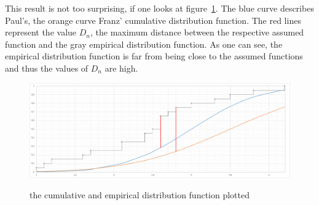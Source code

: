 \documentclass{article}
\theoremstyle{definition}
\begin{document}
This result is not too surprising, if one looks at figure~\ref{fig:1}. The blue curve describes Paul's, the orange curve Franz' cumulative distribution function. The red lines represent the value $D_n$, the maximum distance between the respective assumed function and the gray empirical distribution function.
As one can see, the empirical distribution function is far from being close to the assumed functions and thus the values of $D_n$ are high.
\begin{figure}[here]
\caption{the cumulative and empirical distribution function plotted}
\center
\includegraphics[width=1.0\textwidth]{figures/diagramKSexample.png}
\label{fig:1}
\end{figure}
\end{document}
